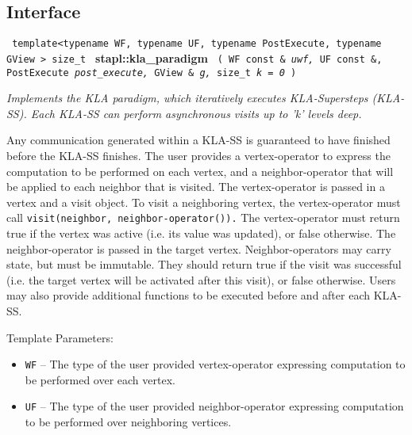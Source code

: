 \subsection{Interface} \label{sec-kla-alg-inter}

\noindent
\texttt{%
template<typename WF, typename UF, typename PostExecute, typename GView >
\newline
size\_t 
}
\newline
\textbf{stapl::kla\_paradigm}%
\newline
\texttt{%
(
WF const \&
\textit{uwf,}%
UF const \&,
PostExecute
\textit{post\_execute,}%
GView \&
\textit{g,}%
size\_t
\textit{k = 0}%
)     
}
\vspace{0.4cm}

\textit{
Implements the KLA paradigm, which iteratively executes KLA-Supersteps (KLA-SS). Each KLA-SS can perform asynchronous visits up to 'k' levels deep. 
}
\vspace{0.4cm}

Any communication generated within a KLA-SS is guaranteed to have finished before the KLA-SS finishes. The user provides a vertex-operator to express the computation to be performed on each vertex, and a neighbor-operator that will be applied to each neighbor that is visited. The vertex-operator is passed in a vertex and a visit object. To visit a neighboring vertex, the vertex-operator must call 
\texttt{visit(neighbor, neighbor-operator()).}
 The vertex-operator must return true if the vertex was active (i.e. its value was updated), or false otherwise. The neighbor-operator is passed in the target vertex. Neighbor-operators may carry state, but must be immutable. They should return true if the visit was successful (i.e. the target vertex will be activated after this visit), or false otherwise. Users may also provide additional functions to be executed before and after each KLA-SS.

Template Parameters:
\begin{itemize}
\item
\texttt{WF} --
The type of the user provided vertex-operator expressing computation to be performed over each vertex.
\item
\texttt{UF} --
The type of the user provided neighbor-operator expressing computation to be performed over neighboring vertices.
\end{itemize}

